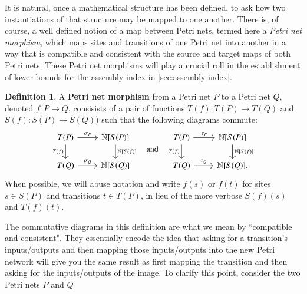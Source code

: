 \documentclass[aps,prd,onecolumn,nofootinbib,letterpaper,preprintnumbers,superscriptaddress,eqsecnum]{revtex4}
\theoremstyle{definition}
\newtheorem{definition}{Definition}
\newcommand{\N}{\mathbb{N}}
\begin{document}
It is natural, once a mathematical structure has been defined, to ask how two instantiations of that structure may be mapped to one another.
There is, of course, a well defined notion of a map between Petri nets, termed here a \textit{Petri net morphism}, which maps sites and transitions of one Petri net into another in a way that is compatible and consistent with the source and target maps of both Petri nets.
These Petri net morphisms will play a crucial roll in the establishment of lower bounds for the assembly index in \cref{sec:assembly-index}.

\begin{definition}\label{def:petri-map}
    A \textbf{Petri net morphism} from a Petri net $P$ to a Petri net $Q$, denoted $f : P \rightarrow Q$, consisists of a pair of functions $T(f) : T(P) \rightarrow T(Q)$ and $S(f): S(P) \rightarrow S(Q))$ such that the following diagrams commute:
    \begin{equation*}
        \begin{tikzcd}
            T(P)
            \arrow[r, "\sigma_P"]
            \arrow[d, "T(f)", swap]
            &
            \N[S(P)]
            \arrow[d, "\N \lbrack S(f) \rbrack"]
            \\
            T(Q)
            \arrow[r, "\sigma_Q"]
            &
            \N[S(Q)]
        \end{tikzcd}
        \quad
        \textrm{and}
        \quad
        \begin{tikzcd}
            T(P)
            \arrow[r, "\tau_P"]
            \arrow[d, "T(f)", swap]
            &
            \N[S(P)]
            \arrow[d, "\N \lbrack S(f) \rbrack"]
            \\
            T(Q)
            \arrow[r, "\tau_Q"]
            &
            \N[S(Q)].
        \end{tikzcd}
    \end{equation*}
    When possible, we will abuse notation and write $f(s)$ or $f(t)$ for sites $s \in S(P)$ and transitions $t \in T(P)$, in lieu of the more verbose $S(f)(s)$ and $T(f)(t)$.
\end{definition}

The commutative diagrams in this definition are what we mean by ``compatible and consistent".
They essentially encode the idea that asking for a transition's inputs/outputs and then mapping those inputs/outputs into the new Petri network will give you the same result as first mapping the transition and then asking for the inputs/outputs of the image.
To clarify this point, consider the two Petri nets $P$ and $Q$
\end{document}
